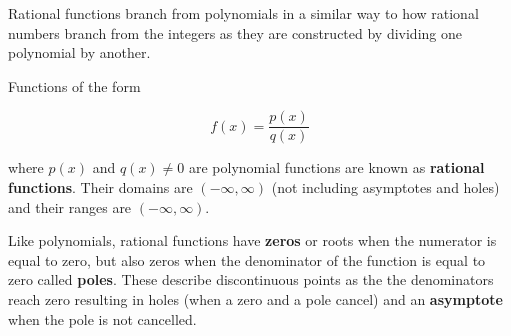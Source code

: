 Rational functions branch from polynomials in a similar way to how rational numbers branch from the integers as they are constructed by dividing one polynomial by another.

\begin{definition}
    Functions of the form

    \begin{equation}
        f(x) = \frac{p(x)}{q(x)}
    \end{equation}

    \noindent where $p(x)$ and $q(x) \neq 0$ are polynomial functions are known as \textbf{rational functions}. Their domains are $(-\infty,\infty)$ (not including asymptotes and holes) and their ranges are $(-\infty,\infty)$.
\end{definition}

Like polynomials, rational functions have \textbf{zeros} or roots when the numerator is equal to zero, but also zeros when the denominator of the function is equal to zero called \textbf{poles}. These describe discontinuous points as the the denominators reach zero resulting in holes (when a zero and a pole cancel) and an \textbf{asymptote} when the pole is not cancelled.


